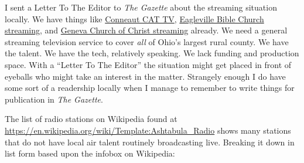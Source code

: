I sent a Letter To The Editor to \emph{The Gazette} about the streaming
situation locally. We have things like
\href{https://vimeo.com/user126359532}{Conneaut CAT TV},
\href{https://www.youtube.com/channel/UCY_bWD4nXv5U1FJZF3tfZ6g}{Eagleville
Bible Church streaming}, and
\href{https://www.twitch.tv/genevachurchofchrist}{Geneva Church of
Christ streaming} already. We need a general streaming television
service to cover \emph{all} of Ohio's largest rural county. We have the
talent. We have the tech, relatively speaking. We lack funding and
production space. With a ``Letter To The Editor'' the situation might
get placed in front of eyeballs who might take an interest in the
matter. Strangely enough I do have some sort of a readership locally
when I manage to remember to write things for publication in \emph{The
Gazette}.

The list of radio stations on Wikipedia found at
\url{https://en.wikipedia.org/wiki/Template:Ashtabula_Radio} shows many
stations that do not have local air talent routinely broadcasting live.
Breaking it down in list form based upon the infobox on Wikipedia:

